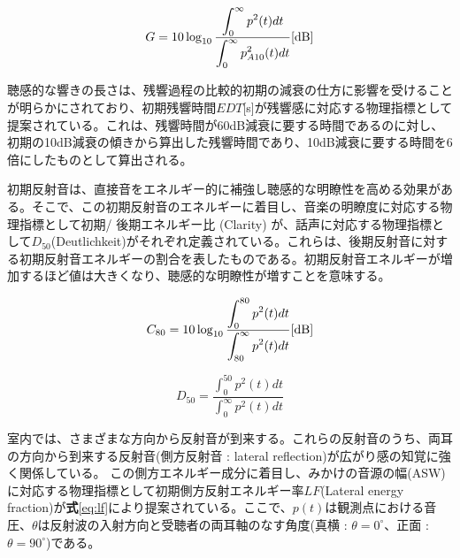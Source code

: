 \begin{equation}
  \label{eq:STG}
  G = 10\log_{10}{\frac{\displaystyle\int_0^{\infty}p^2(t)dt}{\displaystyle\int_0^{\infty}p_{A10}^2(t)dt}} \textrm{[dB]}
\end{equation}

聴感的な響きの長さは、残響過程の比較的初期の減衰の仕方に影響を受けることが明らかにされており、初期残響時間$EDT$[s]が残響感に対応する物理指標として提案されている。これは、残響時間が60dB減衰に要する時間であるのに対し、初期の10dB減衰の傾きから算出した残響時間であり、10dB減衰に要する時間を6倍にしたものとして算出される。

初期反射音は、直接音をエネルギー的に補強し聴感的な明瞭性を高める効果がある。そこで、この初期反射音のエネルギーに着目し、音楽の明瞭度に対応する物理指標として初期/ 後期エネルギー比 \Clarity(Clarity) が、話声に対応する物理指標として$D_{50}$(Deutlichkeit)がそれぞれ定義されている。これらは、後期反射音に対する初期反射音エネルギーの割合を表したものである。初期反射音エネルギーが増加するほど値は大きくなり、聴感的な明瞭性が増すことを意味する。

\begin{equation}
    \label{eq:c80}
  C_{80} = 10\log_{10}{\frac{\displaystyle\int_0^{80}p^2(t)dt}{\displaystyle\int_{80}^{\infty}p^2(t)dt}} \textrm{[dB]}
\end{equation}

\begin{equation}
    \label{eq:c80}
  D_{50} = {\frac{\displaystyle\int_0^{50}p^2(t)dt}{\displaystyle\int_0^{\infty}p^2(t)dt}} 
\end{equation}

室内では、さまざまな方向から反射音が到来する。これらの反射音のうち、両耳の方向から到来する反射音(側方反射音 : lateral reflection)が広がり感の知覚に強く関係している。
この側方エネルギー成分に着目し、みかけの音源の幅(ASW)に対応する物理指標として初期側方反射エネルギー率$LF$(Lateral energy fraction)が\textbf{式}\ref{eq:lf}により提案されている。ここで、$p(t)$は観測点における音圧、$\theta$は反射波の入射方向と受聴者の両耳軸のなす角度(真横 : $\theta = 0^\circ$、正面 : $\theta = 90^\circ$)である。

